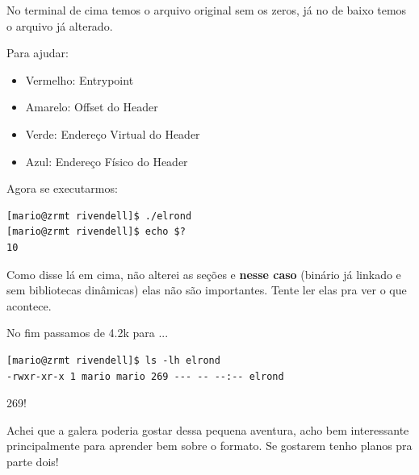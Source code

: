 \documentclass[12pt]{article}
\begin{document}
No terminal de cima temos o arquivo original sem os zeros, já no de baixo temos o arquivo já alterado.

Para ajudar:
\begin{itemize}
	\item Vermelho: Entrypoint
    \item Amarelo: Offset do Header
    \item Verde: Endereço Virtual do Header
    \item Azul: Endereço Físico do Header
\end{itemize}
Agora se executarmos:
\begin{verbatim}
[mario@zrmt rivendell]$ ./elrond
[mario@zrmt rivendell]$ echo $?
10
\end{verbatim}
Como disse lá em cima, não alterei as seções e \textbf{nesse caso} (binário já linkado e sem bibliotecas dinâmicas) elas não são importantes. Tente ler elas pra ver o que acontece.

No fim passamos de 4.2k para ...

\begin{verbatim}
[mario@zrmt rivendell]$ ls -lh elrond
-rwxr-xr-x 1 mario mario 269 --- -- --:-- elrond
\end{verbatim}
269!

Achei que a galera poderia gostar dessa pequena aventura, acho bem interessante principalmente para aprender bem sobre o formato. Se gostarem tenho planos pra parte dois!
\end{document}
